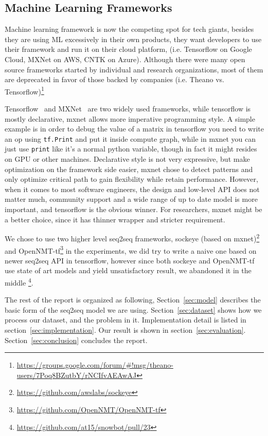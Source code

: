 \documentclass{article}
\begin{document}
\subsection{Machine Learning Frameworks}
\label{subsec:ml-frameworks}

Machine learning framework is now the competing spot for tech giants, besides they are using ML excessively in their own products,
they want developers to use their framework and run it on their cloud platform, (i.e. Tensorflow on Google Cloud, MXNet on AWS, CNTK on Azure).
Although there were many open source frameworks started by individual and research organizations, most of them are deprecated
in favor of those backed by companies (i.e. Theano vs. Tensorflow)\footnote{\url{https://groups.google.com/forum/\#!msg/theano-users/7Poq8BZutbY/rNCIfvAEAwAJ}}

Tensorflow~\cite{abadi2016tensorflow} and MXNet~\cite{chen2015mxnet} are two widely used frameworks, while tensorflow is
mostly declarative, mxnet allows more imperative programming style.
A simple example is in order to debug the value of a matrix in tensorflow you need to write an op using \verb+tf.Print+ and put it inside compute graph,
while in mxnet you can just use \verb+print+ like it's a normal python variable, though in fact it might resides on GPU or other machines.
Declarative style is not very expressive, but make optimization on the framework side easier, mxnet chose to detect patterns
and only optimize critical path to gain flexibility while retain performance.
However, when it comes to most software engineers, the design and low-level API does not matter much,
community support and a wide range of up to date model is more important, and tensorflow is the obvious winner.
For researchers, mxnet might be a better choice, since it has thinner wrapper and stricter requirement.

We chose to use two higher level seq2seq frameworks, sockeye (based on mxnet)\footnote{\url{https://github.com/awslabs/sockeye}}
and OpenNMT-tf\footnote{\url{https://github.com/OpenNMT/OpenNMT-tf}} in the experiments,
we did try to write a naive one based on newer seq2seq API in tensorflow, however since both sockeye and OpenNMT-tf use state of art models
and yield unsatisfactory result, we abandoned it in the middle \footnote{\url{https://github.com/at15/snowbot/pull/23}}.

The rest of the report is organized as following, Section~\ref{sec:model} describes the basic form of the seq2seq model we are using.
Section~\ref{sec:dataset} shows how we process our dataset, and the problem in it.
Implementation detail is listed in section~\ref{sec:implementation}.
Our result is shown in section~\ref{sec:evaluation}.
Section~\ref{sec:conclusion} concludes the report.
\end{document}
